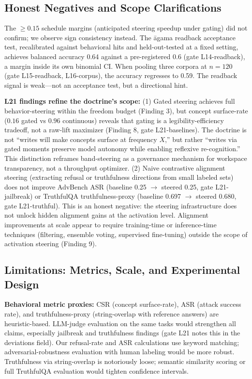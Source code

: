 \label{sec:discussion}

\subsection*{Honest Negatives and Scope Clarifications}

The $\geq 0.15$ schedule margins (anticipated steering speedup under gating) did not confirm;
we observe sign consistency instead.
The \=agama readback acceptance test, recalibrated against behavioral hits and held-out-tested at
a fixed setting, achieves balanced accuracy 0.64 against a pre-registered 0.6 (gate L14-readback),
a margin inside its own binomial CI.
When pooling three corpora at $n=120$ (gate L15-readback, L16-corpus), the accuracy regresses to 0.59.
The readback signal is weak---not an acceptance test, but a directional hint.

\textbf{L21 findings refine the doctrine's scope:}
(1) Gated steering achieves full behavior-steering within the freedom budget (Finding 3), but concept
surface-rate ($0.16$ gated vs $0.96$ continuous) reveals that gating is a legibility-efficiency tradeoff,
not a raw-lift maximizer (Finding 8, gate L21-baselines). The doctrine is not ``writes will make concepts
surface at frequency $X$,'' but rather ``writes via gated moments preserve model autonomy while enabling
reflexive re-cognition.'' This distinction reframes band-steering as a governance mechanism for workspace
transparency, not a throughput optimizer.
(2) Naive contrastive alignment steering (extracting refusal or truthfulness directions from small labeled
sets) does not improve AdvBench ASR (baseline 0.25 $\to$ steered 0.25, gate L21-jailbreak) or TruthfulQA
truthfulness-proxy (baseline 0.697 $\to$ steered 0.680, gate L21-truthful). This is an honest negative: the
steering infrastructure does not unlock hidden alignment gains at the activation level. Alignment improvements
at scale appear to require training-time or inference-time techniques (filtering, ensemble voting, supervised
fine-tuning) outside the scope of activation steering (Finding 9).

\subsection*{Limitations: Metrics, Scale, and Experimental Design}

\textbf{Behavioral metric proxies:} CSR (concept surface-rate), ASR (attack success rate), and truthfulness-proxy
(string-overlap with reference answers) are heuristic-based. LLM-judge evaluation on the same tasks would strengthen
all claims, especially jailbreak and truthfulness findings (gate L21 notes this in the deviations field).
Our refusal-rate and ASR calculations use keyword matching; adversarial-robustness evaluation with human labeling
would be more robust. Truthfulness via string-overlap is notoriously loose; semantic similarity scoring or full
TruthfulQA evaluation would tighten confidence intervals.

